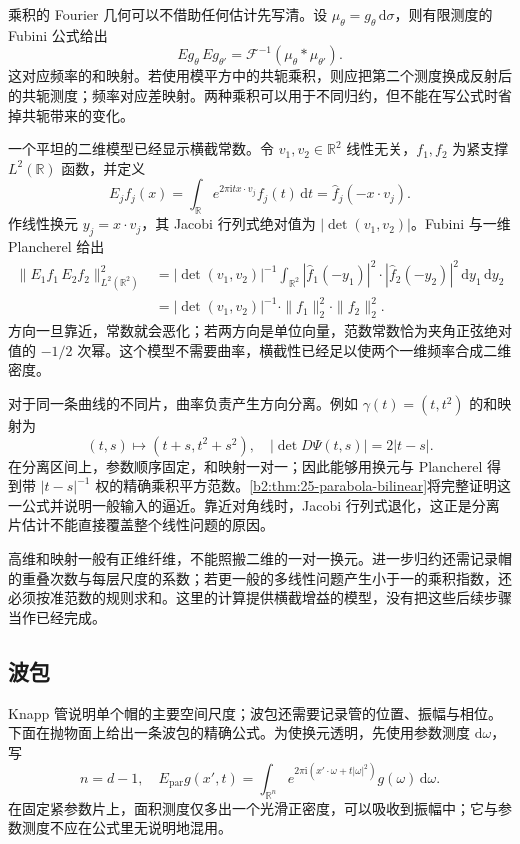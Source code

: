 \ProseParagraphBreak
乘积的 Fourier 几何可以不借助任何估计先写清。设 \(\mu_\theta=g_\theta\,\mathrm d\sigma\)，则有限测度的 Fubini 公式给出
\[
 Eg_\theta\,Eg_{\theta'}
 =\mathcal F^{-1}(\mu_\theta*\mu_{\theta'}).
\]
这对应频率的和映射。若使用模平方中的共轭乘积，则应把第二个测度换成反射后的共轭测度；频率对应差映射。两种乘积可以用于不同归约，但不能在写公式时省掉共轭带来的变化。

一个平坦的二维模型已经显示横截常数。令 \(v_1,v_2\in\mathbb R^2\) 线性无关，\(f_1,f_2\) 为紧支撑 \(L^2(\mathbb R)\) 函数，并定义
\[
 E_jf_j(x)=\int_{\mathbb R}
       e^{2\pi\mathrm i t x\cdot v_j}f_j(t)\,\mathrm dt
       =\widehat f_j(-x\cdot v_j).
\]
作线性换元 \(y_j=x\cdot v_j\)，其 Jacobi 行列式绝对值为 \(|\det(v_1,v_2)|\)。Fubini 与一维 Plancherel 给出
\[
 \begin{aligned}
 \|E_1f_1\,E_2f_2\|_{L^2(\mathbb R^2)}^2
 &=|\det(v_1,v_2)|^{-1}
   \int_{\mathbb R^2}
      |\widehat f_1(-y_1)|^2\cdot|\widehat f_2(-y_2)|^2
      \,\mathrm dy_1\,\mathrm dy_2\\
 &=|\det(v_1,v_2)|^{-1}
      \cdot\|f_1\|_2^2\cdot\|f_2\|_2^2.
 \end{aligned}
\]
方向一旦靠近，常数就会恶化；若两方向是单位向量，范数常数恰为夹角正弦绝对值的 \(-1/2\) 次幂。这个模型不需要曲率，横截性已经足以使两个一维频率合成二维密度。

\ProseParagraphBreak
对于同一条曲线的不同片，曲率负责产生方向分离。例如 \(\gamma(t)=(t,t^2)\) 的和映射为
\[
 (t,s)\longmapsto(t+s,t^2+s^2),\quad
 |\det D\Psi(t,s)|=2|t-s|.
\]
在分离区间上，参数顺序固定，和映射一对一；因此能够用换元与 Plancherel 得到带 \(|t-s|^{-1}\) 权的精确乘积平方范数。\cref{b2:thm:25-parabola-bilinear}将完整证明这一公式并说明一般输入的逼近。靠近对角线时，Jacobi 行列式退化，这正是分离片估计不能直接覆盖整个线性问题的原因。

高维和映射一般有正维纤维，不能照搬二维的一对一换元。进一步归约还需记录帽的重叠次数与每层尺度的系数；若更一般的多线性问题产生小于一的乘积指数，还必须按准范数的规则求和。这里的计算提供横截增益的模型，没有把这些后续步骤当作已经完成。

\subsection{波包}
\label{b2:subsec:230603}

Knapp 管说明单个帽的主要空间尺度；波包还需要记录管的位置、振幅与相位。下面在抛物面上给出一条波包的精确公式。为使换元透明，先使用参数测度 \(\mathrm d\omega\)，写
\[
 n=d-1,\quad
 E_{\mathrm{par}}g(x',t)
 =\int_{\mathbb R^n}
       e^{2\pi\mathrm i(x'\cdot\omega+t|\omega|^2)}
       g(\omega)\,\mathrm d\omega.
\]
在固定紧参数片上，面积测度仅多出一个光滑正密度，可以吸收到振幅中；它与参数测度不应在公式里无说明地混用。

